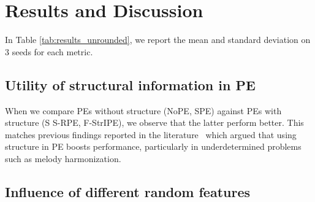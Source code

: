 \section{Results and Discussion}

\begin{table}[b]
\centering
{}
\caption{Complexity analysis for different methods with $\ell$ layers, $\mathcal{h}$ heads, $\mathcal{d}$ head dimension, $\mathcal{s}$ structures, and $\mathcal{t}$ sequence length. A typical order for size is $\mathcal{s} < (\mathcal{h}, \ell) << \mathcal{d} <<< \mathcal{t} $, with $\mathcal{s}$ contributing the least and $\mathcal{t}$ contributing the most, assuming equal growth rate.}
\label{tab:complexity}
\end{table}

In Table \ref{tab:results_unrounded}, we report the mean and standard deviation on 3 seeds for each metric.

\subsection{Utility of structural information in PE}

When we compare PEs without structure (NoPE, SPE) against PEs with structure (S S-RPE, F-StrIPE), we observe that the latter perform better. This matches previous findings reported in the literature~\cite{agarwal_structure_2024} which argued that using structure in PE boosts performance, particularly in underdetermined problems such as melody harmonization.

\subsection{Influence of different random features}

